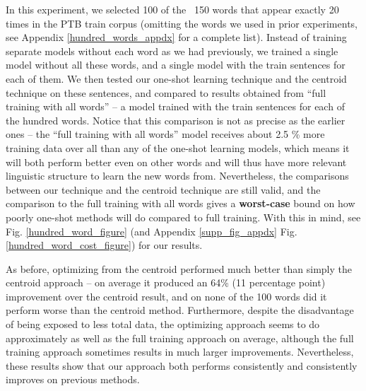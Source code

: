 \documentclass{article}
\begin{document}
In this experiment, we selected 100 of the ~150 words that appear exactly 20 times in the PTB train corpus (omitting the words we used in prior experiments, see Appendix \ref{hundred_words_appdx} for a complete list). Instead of training separate models without each word as we had previously, we trained a single model without all these words, and a single model with the train sentences for each of them. We then tested our one-shot learning technique and the centroid technique on these sentences, and compared to results obtained from ``full training with all words'' -- a model trained with the train sentences for each of the hundred words. Notice that this comparison is not as precise as the earlier ones -- the ``full training with all words'' model receives about 2.5 \% more training data over all than any of the one-shot learning models, which means it will both perform better even on other words and will thus have more relevant linguistic structure to learn the new words from. Nevertheless, the comparisons between our technique and the centroid technique are still valid, and the comparison to the full training with all words gives a \textbf{worst-case} bound on how poorly one-shot methods will do compared to full training. With this in mind, see Fig. \ref{hundred_word_figure} (and Appendix \ref{supp_fig_appdx} Fig. \ref{hundred_word_cost_figure}) for our results.\par
As before, optimizing from the centroid performed much better than simply the centroid approach -- on average it produced an 64\% (11 percentage point) improvement over the centroid result, and on none of the 100 words did it perform worse than the centroid method. Furthermore, despite the disadvantage of being exposed to less total data, the optimizing approach seems to do approximately as well as the full training approach on average, although the full training approach sometimes results in much larger improvements. Nevertheless, these results show that our approach both performs consistently and consistently improves on previous methods. \par
\end{document}
